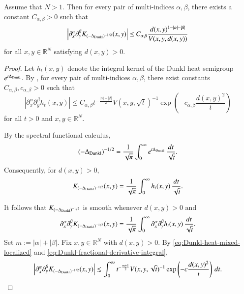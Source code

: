 \documentclass[12pt]{amsart}
\begin{document}
\begin{lemma}\label{lem:Dunkl-fractional-kernel-derivative}
Assume that $N>1$. Then for every pair of multi-indices $\alpha,\beta$, there exists
a constant $C_{\alpha,\beta}>0$ such that
\begin{equation}\label{eq:localized-K-derivative}
\left|
\partial_x^\alpha\partial_y^\beta
K_{(-\Delta_{{\rm Dunkl}})^{-1/2}}(x,y)
\right|
\leq
C_{\alpha,\beta}
\frac{
d(x,y)^{1-|\alpha|-|\beta|}
}{
V(x,y,d(x,y))
}
\end{equation}
for all $x,y\in\mathbb R^N$ satisfying $d(x,y)>0$.
\end{lemma}

\begin{proof}
Let $h_t(x,y)$ denote the integral kernel of the Dunkl heat semigroup
$e^{t\Delta_{{\rm Dunkl}}}$. By
\cite[Theorem~4.1(d)]{MR4014802}, for every pair of multi-indices
$\alpha,\beta$, there exist constants
$C_{\alpha,\beta},c_{\alpha,\beta}>0$ such that
\begin{equation}\label{eq:Dunkl-heat-mixed-localized}
\left|
\partial_x^\alpha\partial_y^\beta h_t(x,y)
\right|
\leq
C_{\alpha,\beta}
t^{-\frac{|\alpha|+|\beta|}{2}}
V(x,y,\sqrt t)^{-1}
\exp\left(
-c_{\alpha,\beta}\frac{d(x,y)^2}{t}
\right)
\end{equation}
for all $t>0$ and $x,y\in\mathbb R^N$.


By the spectral functional calculus,
\[
(-\Delta_{{\rm Dunkl}})^{-1/2}
=
\frac{1}{\sqrt{\pi}}
\int_0^\infty
e^{t\Delta_{{\rm Dunkl}}}\,
\frac{dt}{\sqrt t}.
\]
Consequently, for $d(x,y)>0$,
\begin{equation}\label{eq:Dunkl-fractional-kernel-localized}
K_{(-\Delta_{{\rm Dunkl}})^{-1/2}}(x,y)
=
\frac{1}{\sqrt{\pi}}
\int_0^\infty
h_t(x,y)\,\frac{dt}{\sqrt t}.
\end{equation}

It follows that
$K_{(-\Delta_{{\rm Dunkl}})^{-1/2}}$ is smooth whenever $d(x,y)>0$ and
\begin{equation}\label{eq:Dunkl-fractional-derivative-integral}
\partial_x^\alpha\partial_y^\beta
K_{(-\Delta_{{\rm Dunkl}})^{-1/2}}(x,y)
=
\frac{1}{\sqrt{\pi}}
\int_0^\infty
\partial_x^\alpha\partial_y^\beta h_t(x,y)
\,\frac{dt}{\sqrt t}.
\end{equation}
Set
$
m:=|\alpha|+|\beta|.
$
Fix $x,y\in\mathbb R^N$ with $d(x,y)>0$. By
\eqref{eq:Dunkl-heat-mixed-localized} and
\eqref{eq:Dunkl-fractional-derivative-integral},
\begin{equation}\label{eq:K-derivative-volume}
\left|
\partial_x^\alpha\partial_y^\beta
K_{(-\Delta_{{\rm Dunkl}})^{-1/2}}(x,y)
\right|
\lesssim
\int_0^\infty
t^{-\frac{m+1}{2}}
V(x,y,\sqrt t)^{-1}
\exp\left(
-c\frac{d(x,y)^2}{t}
\right)\,dt.
\end{equation}


\end{proof}
\end{document}
